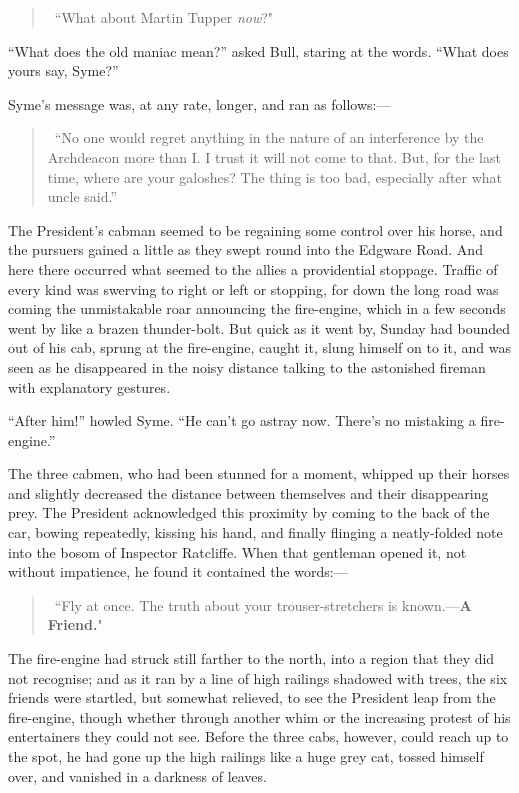 \documentclass{book}
\begin{document}
\begin{quotation}\
	“What about Martin Tupper \emph{now}?"
\end{quotation}

“What does the old maniac mean?” asked Bull, staring at the words. “What does yours say, Syme?”

Syme’s message was, at any rate, longer, and ran as follows:—

\begin{quotation}\
	“No one would regret anything in the nature of an interference by the Archdeacon more than I. I trust it will not come to that. But, for the last time, where are your galoshes? The thing is too bad, especially after what uncle said.”
\end{quotation}

The President’s cabman seemed to be regaining some control over his horse, and the pursuers gained a little as they swept round into the Edgware Road. And here there occurred what seemed to the allies a providential stoppage. Traffic of every kind was swerving to right or left or stopping, for down the long road was coming the unmistakable roar announcing the fire-engine, which in a few seconds went by like a brazen thunder-bolt. But quick as it went by, Sunday had bounded out of his cab, sprung at the fire-engine, caught it, slung himself on to it, and was seen as he disappeared in the noisy distance talking to the astonished fireman with explanatory gestures.

“After him!” howled Syme. “He can’t go astray now. There’s no mistaking a fire-engine.”

The three cabmen, who had been stunned for a moment, whipped up their horses and slightly decreased the distance between themselves and their disappearing prey. The President acknowledged this proximity by coming to the back of the car, bowing repeatedly, kissing his hand, and finally flinging a neatly-folded note into the bosom of Inspector Ratcliffe. When that gentleman opened it, not without impatience, he found it contained the words:—

\begin{quotation}\
	“Fly at once. The truth about your trouser-stretchers is known.—\textbf{A Friend.}"
\end{quotation}

The fire-engine had struck still farther to the north, into a region that they did not recognise; and as it ran by a line of high railings shadowed with trees, the six friends were startled, but somewhat relieved, to see the President leap from the fire-engine, though whether through another whim or the increasing protest of his entertainers they could not see. Before the three cabs, however, could reach up to the spot, he had gone up the high railings like a huge grey cat, tossed himself over, and vanished in a darkness of leaves.
\end{document}
